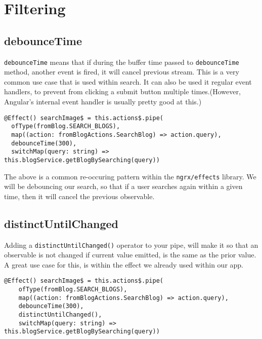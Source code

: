 \chapter{Filtering}

\section{debounceTime}
\lstinline{debounceTime} means that if during the buffer time passed to 
\lstinline{debounceTime} method, another event is fired, it will cancel 
previous stream. This is a very common use case that is used within search.
It can also be used it regular event handlers, to prevent from clicking a 
submit button multiple times.(However, Angular's internal event handler 
is usually pretty good at this.)


\begin{lstlisting}[caption=blog.effects.ts]
@Effect() searchImage$ = this.actions$.pipe(
  ofType(fromBlog.SEARCH_BLOGS),
  map((action: fromBlogActions.SearchBlog) => action.query),
  debounceTime(300),
  switchMap(query: string) => this.blogService.getBlogBySearching(query))
\end{lstlisting}

The above is a common re-occuring pattern within the \lstinline{ngrx/effects}
library. We will be debouncing our search, so that if a user searches again 
within a given time, then it will cancel the previous observable. 

\section{distinctUntilChanged} 
Adding a \lstinline{distinctUntilChanged()} operator to your pipe, will make 
it so that an observable is not changed if current value emitted, is the same
as the prior value. A great use case for this, is within the effect we 
already used within our app.

\begin{lstlisting}[caption=blog.effects.ts]
  @Effect() searchImage$ = this.actions$.pipe(
    ofType(fromBlog.SEARCH_BLOGS),
    map((action: fromBlogActions.SearchBlog) => action.query),
    debounceTime(300),
    distinctUntilChanged(),
    switchMap(query: string) => this.blogService.getBlogBySearching(query))
\end{lstlisting}


